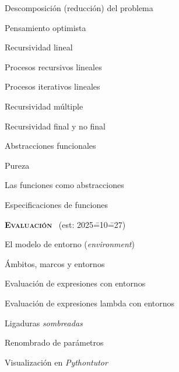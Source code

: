 \begin{longenum}
\begin{longenum}
\begin{longenum}
\begin{longenum}
                \item Descomposición (reducción) del problema
                \item Pensamiento optimista
            \end{longenum}
            \item Recursividad lineal
            \begin{longenum}
                \item Procesos recursivos lineales \opcional\
                \item Procesos iterativos lineales \opcional\
            \end{longenum}
            \item Recursividad múltiple
            \item Recursividad final y no final \opcional\
        \end{longenum}
        \item Abstracciones funcionales
        \begin{longenum}
            \item Pureza
            \item Las funciones como abstracciones
            \begin{longenum}
                \item Especificaciones de funciones
            \end{longenum}
        \end{longenum}
    \end{longenum}
    \item \textbf{\textsc{Evaluación}} \ (est: 2025\==10\==27)
    \begin{longenum}
        \item El modelo de entorno (\textit{environment})
        \begin{longenum}
            \item Ámbitos, marcos y entornos
            \item Evaluación de expresiones con entornos
            \item Evaluación de expresiones lambda con entornos
            \begin{longenum}
                \item Ligaduras \textit{sombreadas}
                \item Renombrado de parámetros
                \item Visualización en \textit{Pythontutor}
            \end{longenum}
        \end{longenum}

\end{longenum}
\end{longenum}
